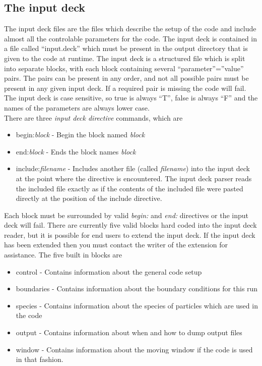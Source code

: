 \documentclass[12pt,a4paper]{article}
\newcommand{\EPOCH}{{\color{warwickdark}\fontfamily{phv}\selectfont{EPOCH}}}
\begin{document}
\subsection{The {\EPOCH} input deck}
The input deck files are the files which describe the setup of the code and
include almost all the controlable parameters for the code. The input deck is
contained in a file called ``input.deck'' which must be present in the output
directory that is given to the code at runtime. The input deck is a structured
file which is split into separate blocks, with each block containing several
``parameter''=''value'' pairs. The pairs can be present in any order, and not
all possible pairs must be present in any given input deck. If a required pair
is missing the code will fail. The input deck is case sensitive, so true is
always ``T'', false is always ``F'' and the names of the parameters are always
lower case.\\

There are three {\it input deck directive} commands, which are
\begin{itemize}
\item begin:{\it block} - Begin the block named {\it block}
\item end:{\it block} - Ends the block names {\it block}
\item include:{\it filename} - Includes another file (called {\it filename})
  into the input deck at the point where the directive is encountered. The
  input deck parser reads the included file exactly as if the contents of the
  included file were pasted directly at the position of the include directive.
\end{itemize}
Each block must be surrounded by valid {\it begin:} and {\it end:} directives
or the input deck will fail. There are currently five valid blocks hard coded
into the input deck reader, but it is possible for end users to extend the
input deck. If the input deck has been extended then you must contact the
writer of the extension for assistance. The five built in blocks are
\begin{itemize}
\item control - Contains information about the general code setup
\item boundaries - Contains information about the boundary conditions for this
  run
\item species - Contains information about the species of particles which are
  used in the code
\item output - Contains information about when and how to dump output files
\item window - Contains information about the moving window if the code is
  used in that fashion.
\end{itemize}
\end{document}

